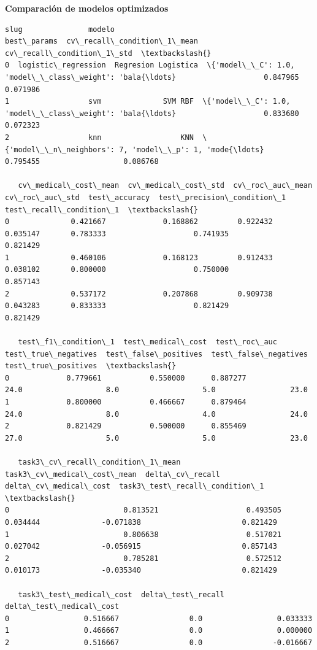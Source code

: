\documentclass[11pt]{article}
\begin{document}
    \textbf{Comparación de modelos optimizados}

    
    
    \begin{Verbatim}[commandchars=\\\{\}]
                  slug               modelo                                        best\_params  cv\_recall\_condition\_1\_mean  cv\_recall\_condition\_1\_std  \textbackslash{}
0  logistic\_regression  Regresion Logistica  \{'model\_\_C': 1.0, 'model\_\_class\_weight': 'bala{\ldots}                    0.847965                   0.071986   
1                  svm              SVM RBF  \{'model\_\_C': 1.0, 'model\_\_class\_weight': 'bala{\ldots}                    0.833680                   0.072323   
2                  knn                  KNN  \{'model\_\_n\_neighbors': 7, 'model\_\_p': 1, 'mode{\ldots}                    0.795455                   0.086768   

   cv\_medical\_cost\_mean  cv\_medical\_cost\_std  cv\_roc\_auc\_mean  cv\_roc\_auc\_std  test\_accuracy  test\_precision\_condition\_1  test\_recall\_condition\_1  \textbackslash{}
0              0.421667             0.168862         0.922432        0.035147       0.783333                    0.741935                 0.821429   
1              0.460106             0.168123         0.912433        0.038102       0.800000                    0.750000                 0.857143   
2              0.537172             0.207868         0.909738        0.043283       0.833333                    0.821429                 0.821429   

   test\_f1\_condition\_1  test\_medical\_cost  test\_roc\_auc  test\_true\_negatives  test\_false\_positives  test\_false\_negatives  test\_true\_positives  \textbackslash{}
0             0.779661           0.550000      0.887277                 24.0                   8.0                   5.0                 23.0   
1             0.800000           0.466667      0.879464                 24.0                   8.0                   4.0                 24.0   
2             0.821429           0.500000      0.855469                 27.0                   5.0                   5.0                 23.0   

   task3\_cv\_recall\_condition\_1\_mean  task3\_cv\_medical\_cost\_mean  delta\_cv\_recall  delta\_cv\_medical\_cost  task3\_test\_recall\_condition\_1  \textbackslash{}
0                          0.813521                    0.493505         0.034444              -0.071838                       0.821429   
1                          0.806638                    0.517021         0.027042              -0.056915                       0.857143   
2                          0.785281                    0.572512         0.010173              -0.035340                       0.821429   

   task3\_test\_medical\_cost  delta\_test\_recall  delta\_test\_medical\_cost  
0                 0.516667                0.0                 0.033333  
1                 0.466667                0.0                 0.000000  
2                 0.516667                0.0                -0.016667  
    \end{Verbatim}
\end{document}
